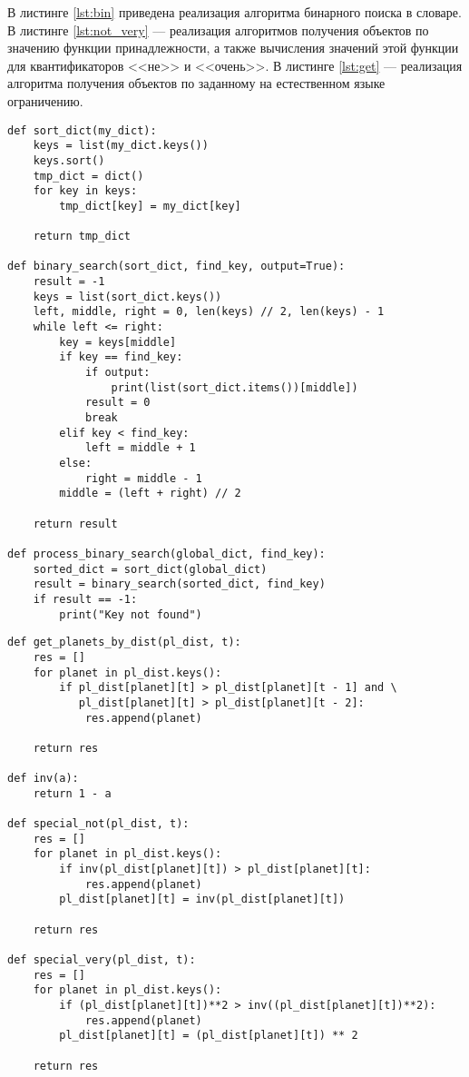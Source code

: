 В листинге \ref{lst:bin} приведена реализация алгоритма бинарного поиска в словаре.
В листинге \ref{lst:not_very} --- реализация алгоритмов получения объектов по значению функции принадлежности, а также вычисления значений этой функции для квантификаторов <<не>> и <<очень>>.
В листинге \ref{lst:get} --- реализация алгоритма получения объектов по заданному на естественном языке ограничению.
\clearpage

\captionsetup{justification=raggedright, singlelinecheck=off}
\begin{lstlisting}[label=lst:bin, caption=Реализация алгоритма бинарного поиска]
def sort_dict(my_dict):
    keys = list(my_dict.keys())
    keys.sort()
    tmp_dict = dict()
    for key in keys:
        tmp_dict[key] = my_dict[key]

    return tmp_dict

def binary_search(sort_dict, find_key, output=True):
    result = -1
    keys = list(sort_dict.keys())
    left, middle, right = 0, len(keys) // 2, len(keys) - 1
    while left <= right:
        key = keys[middle]
        if key == find_key:
            if output:
                print(list(sort_dict.items())[middle])
            result = 0
            break
        elif key < find_key:
            left = middle + 1
        else:
            right = middle - 1
        middle = (left + right) // 2

    return result

def process_binary_search(global_dict, find_key):
    sorted_dict = sort_dict(global_dict)
    result = binary_search(sorted_dict, find_key)
    if result == -1:
        print("Key not found")
\end{lstlisting}

\clearpage

\begin{lstlisting}[label=lst:not_very, caption=Реализация алгоритмов вычисления значений функций принадлежности]
def get_planets_by_dist(pl_dist, t):
    res = []
    for planet in pl_dist.keys():
        if pl_dist[planet][t] > pl_dist[planet][t - 1] and \
           pl_dist[planet][t] > pl_dist[planet][t - 2]:
            res.append(planet)

    return res
    
def inv(a):
    return 1 - a

def special_not(pl_dist, t):
    res = []
    for planet in pl_dist.keys():
        if inv(pl_dist[planet][t]) > pl_dist[planet][t]:
            res.append(planet)
        pl_dist[planet][t] = inv(pl_dist[planet][t])

    return res

def special_very(pl_dist, t):
    res = []
    for planet in pl_dist.keys():
        if (pl_dist[planet][t])**2 > inv((pl_dist[planet][t])**2):
            res.append(planet)
        pl_dist[planet][t] = (pl_dist[planet][t]) ** 2

    return res
\end{lstlisting}

